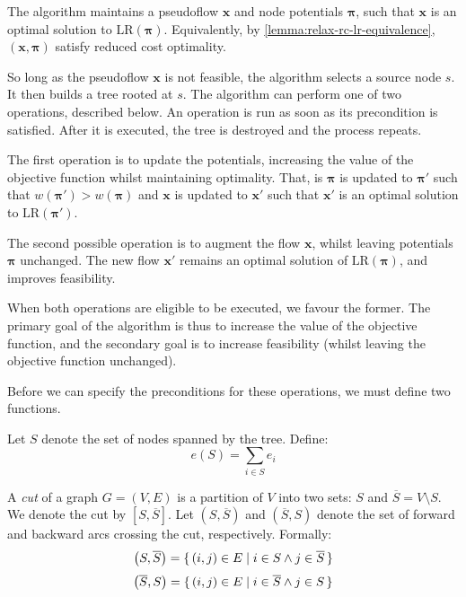 The algorithm maintains a pseudoflow $\mathbf{x}$ and node potentials $\boldsymbol{\pi}$, such that $\mathbf{x}$ is an optimal solution to $\mathrm{LR}(\boldsymbol{\pi})$. Equivalently, by \cref{lemma:relax-rc-lr-equivalence}, $\left(\mathbf{x},\boldsymbol{\pi}\right)$ satisfy reduced cost optimality.

So long as the pseudoflow $\mathbf{x}$ is not feasible, the algorithm selects a source node $s$. It then builds a tree rooted at $s$. The algorithm can perform one of two operations, described below. An operation is run as soon as its precondition is satisfied. After it is executed, the tree is destroyed and the process repeats.

The first operation is to update the potentials, increasing the value of the objective function whilst maintaining optimality. That, is $\boldsymbol{\pi}$ is updated to $\boldsymbol{\pi}'$ such that $w\left(\boldsymbol{\pi}'\right) > w\left(\boldsymbol{\pi}\right)$ and $\mathbf{x}$ is updated to $\mathbf{x}'$ such that $\mathbf{x}'$ is an optimal solution to $\mathrm{LR}(\boldsymbol{\pi}')$.

The second possible operation is to augment the flow $\mathbf{x}$, whilst leaving potentials $\boldsymbol{\pi}$ unchanged. The new flow $\mathbf{x}'$ remains an optimal solution of $\mathrm{LR}(\boldsymbol{\pi})$, and improves feasibility.

When both operations are eligible to be executed, we favour the former. The primary goal of the algorithm is thus to increase the value of the objective function, and the secondary goal is to increase feasibility (whilst leaving the objective function unchanged).

Before we can specify the preconditions for these operations, we must define two functions.\\

\begin{defn} \label{defn:relax-tree-excess}
Let $S$ denote the set of nodes spanned by the tree. Define:
\begin{equation} \label{eq:relax-tree-excess}
e(S) = \sum_{i \in S} e_i
\end{equation}
\end{defn}

\begin{defn}[Cuts] \label{defn:relax-cuts}
A \emph{cut} of a graph $G = (V,E)$ is a partition of $V$ into two sets: $S$ and $\overline{S} = V \setminus S$. We denote the cut by $\left[S,\overline{S}\right]$. Let $\left(S,\overline{S}\right)$ and $\left(\overline{S},S\right)$ denote the set of forward and backward arcs crossing the cut, respectively. Formally:
\[\left(S,\overline{S}\right) = \set{(i,j) \in E | i \in S \land j \in \overline{S}}\]
\[\left(\overline{S},S\right) = \set{(i,j) \in E | i \in \overline{S} \land j \in S}\]
\end{defn}

